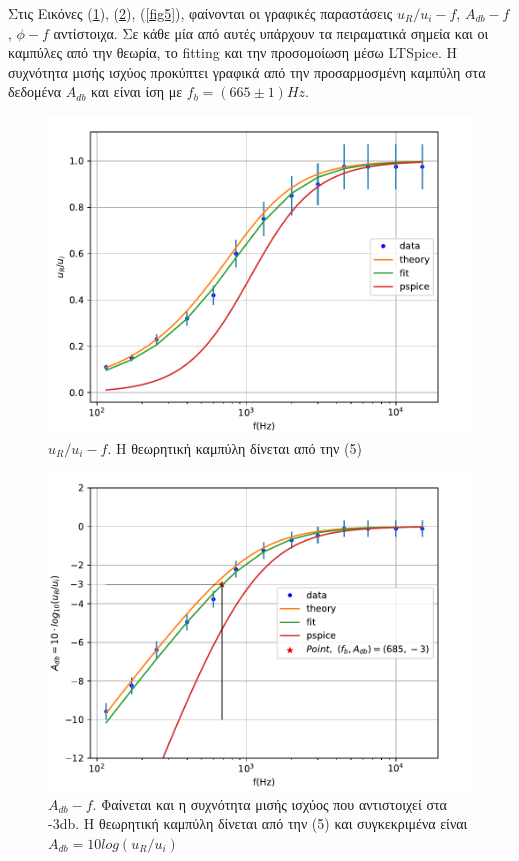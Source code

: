 \documentclass[a4paper]{article}
\begin{document}
		Στις Εικόνες (\ref{fig3}), (\ref{fig4}), (\ref{fig5}), φαίνονται οι γραφικές παραστάσεις $u_R/u_i - f$, $A_{db} - f$, $\phi - f$ αντίστοιχα. Σε κάθε μία από αυτές υπάρχουν τα πειραματικά σημεία και οι καμπύλες από την θεωρία, το fitting και την προσομοίωση μέσω LTSpice. 
		Η συχνότητα μισής ισχύος προκύπτει γραφικά από την προσαρμοσμένη καμπύλη στα δεδομένα $A_{db}$ και είναι ίση με $f_b = (665\pm 1)Hz$.
		\begin{figure}[h!]
			\centering 
			\includegraphics[scale=0.7]{../plots/CR_f-Ur.pdf}
			\caption{$u_R/u_i - f$. Η θεωρητική καμπύλη δίνεται από την (5)}
			\label{fig3}
		\end{figure}
		
		\begin{figure}[h!]
			\centering 
			\includegraphics[scale=0.7]{../plots/CR_f-Adb.pdf}
			\caption{$A_{db} - f$. Φαίνεται και η συχνότητα μισής ισχύος που αντιστοιχεί στα -3db. Η θεωρητική καμπύλη δίνεται από την (5) και συγκεκριμένα είναι $A_{db}=10log(u_R/u_i)$}
			\label{fig4}
		\end{figure}
		
\end{document}
